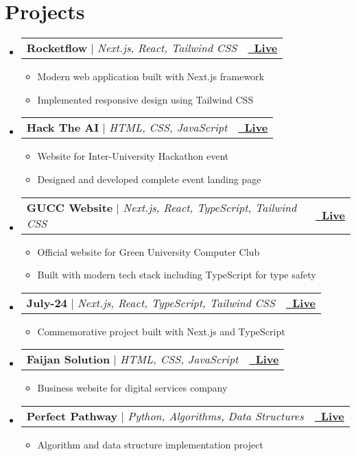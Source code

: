 \documentclass[letterpaper,11pt]{article}
\makeatletter
\newcommand{\resumeItem}[1]{
  \item\small{
    {#1 \vspace{-2pt}}
  }
}
\newcommand{\resumeProjectHeading}[2]{
    \item
    \begin{tabular*}{1.001\textwidth}{l@{\extracolsep{\fill}}r}
      \small#1 & \textbf{\small \color{primarycolor}#2}\\
    \end{tabular*}\vspace{-7pt}
}
\newcommand{\resumeSubHeadingListStart}{\begin{itemize}[leftmargin=0.0in, label={}]}
\newcommand{\resumeSubHeadingListEnd}{\end{itemize}}
\newcommand{\resumeItemListStart}{\begin{itemize}}
\newcommand{\resumeItemListEnd}{\end{itemize}\vspace{-5pt}}
\makeatother
\begin{document}
\section{Projects}
\vspace{2pt}
    \resumeSubHeadingListStart
      \resumeProjectHeading
          {\textbf{\color{accentcolor}Rocketflow} $|$ \emph{Next.js, React, Tailwind CSS}}{\href{https://beta.rocketflow.biz/}{\faExternalLink\ Live}}
          \resumeItemListStart
            \resumeItem{Modern web application built with Next.js framework}
            \resumeItem{Implemented responsive design using Tailwind CSS}
          \resumeItemListEnd
          \vspace{-10pt}
      \resumeProjectHeading
          {\textbf{\color{accentcolor}Hack The AI} $|$ \emph{HTML, CSS, JavaScript}}{\href{https://hacktheai.smythos.com/}{\faExternalLink\ Live}}
          \resumeItemListStart
            \resumeItem{Website for Inter-University Hackathon event}
            \resumeItem{Designed and developed complete event landing page}
          \resumeItemListEnd
          \vspace{-10pt}
      \resumeProjectHeading
          {\textbf{\color{accentcolor}GUCC Website} $|$ \emph{Next.js, React, TypeScript, Tailwind CSS}}{\href{https://gucc.green.edu.bd/}{\faExternalLink\ Live}}
          \resumeItemListStart
            \resumeItem{Official website for Green University Computer Club}
            \resumeItem{Built with modern tech stack including TypeScript for type safety}
          \resumeItemListEnd
          \vspace{-10pt}
      \resumeProjectHeading
          {\textbf{\color{accentcolor}July-24} $|$ \emph{Next.js, React, TypeScript, Tailwind CSS}}{\href{https://july24bd.vercel.app}{\faExternalLink\ Live}}
          \resumeItemListStart
            \resumeItem{Commemorative project built with Next.js and TypeScript}
          \resumeItemListEnd
          \vspace{-10pt}
      \resumeProjectHeading
          {\textbf{\color{accentcolor}Faijan Solution} $|$ \emph{HTML, CSS, JavaScript}}{\href{https://faijansolutions.vercel.app}{\faExternalLink\ Live}}
          \resumeItemListStart
            \resumeItem{Business website for digital services company}
          \resumeItemListEnd
          \vspace{-10pt}
      \resumeProjectHeading
          {\textbf{\color{accentcolor}Perfect Pathway} $|$ \emph{Python, Algorithms, Data Structures}}{\href{https://perfect-pathway.vercel.app}{\faExternalLink\ Live}}
          \resumeItemListStart
            \resumeItem{Algorithm and data structure implementation project}
          \resumeItemListEnd
    \resumeSubHeadingListEnd
\vspace{-8pt}
\end{document}
